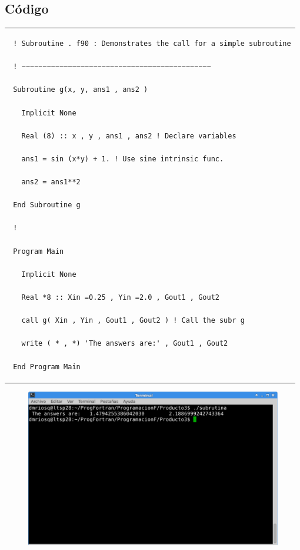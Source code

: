 \documentclass[10pt]{article}
\begin{document}
\subsection{Código}
\begin{tabular}{l}
 \begin{verbatim}  
 ! Subroutine . f90 : Demonstrates the call for a simple subroutine

 ! −−−−−−−−−−−−−−−−−−−−−−−−−−−−−−−−−−−−−−−−−−−−−

 Subroutine g(x, y, ans1 , ans2 )

   Implicit None

   Real (8) :: x , y , ans1 , ans2 ! Declare variables

   ans1 = sin (x*y) + 1. ! Use sine intrinsic func.

   ans2 = ans1**2

 End Subroutine g

 !

 Program Main  

   Implicit None

   Real *8 :: Xin =0.25 , Yin =2.0 , Gout1 , Gout2

   call g( Xin , Yin , Gout1 , Gout2 ) ! Call the subr g

   write ( * , *) 'The answers are:' , Gout1 , Gout2

 End Program Main
 \end{verbatim}
\end{tabular}

\begin{figure}
  \centering
    \includegraphics[scale=0.4]{S}
\end{figure}




\end{document}
